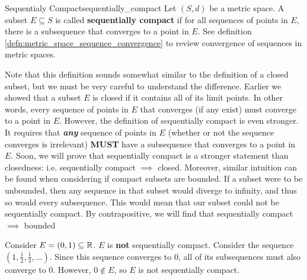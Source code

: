 

\begin{defn}{Sequentialy Compact}{sequentially_compact}
Let \((S, d)\) be a metric space. A subset \(E \subseteq S\) is called \textbf{sequentially compact} if for all sequences of points in \(E\), there is a subsequence that converges to a point in \(E\). See definition \ref{defn:metric_space_sequence_convergence} to review convergence of sequences in metric spaces.
\newline 

Note that this definition sounds somewhat similar to the definition of a closed subset, but we must be very careful to understand the difference. Earlier we showed that a subset \(E\)
 is closed if it contains all of its limit points. In other words, every sequence of points in \(E\) that converges (if any exist) must converge to a point in \(E\). However, the definition of sequentially compact is even stronger. It requires that \textbf{\textit{any}} sequence of points in \(E\) (whether or not the sequence converges is irrelevant) \textbf{MUST} have a subsequence that converges to a point in \(E\). Soon, we will prove that sequentially compact is a stronger statement than closedness: i.e. sequentially compact \(\implies\) closed. Moreover, similar intuition can be found when considering if compact subsets are bounded. If a subset were to be unbounded, then any sequence in that subset would diverge to infinity, and thus so would every subsequence. This would mean that our subset could not be sequentially compact. By contrapositive, we will find that sequentially compact\(\implies\) bounded
 \end{defn}
\begin{exmp}{}{}
Consider \(E = (0, 1) \subseteq {\mathbb R}\). \(E\) is \textbf{not} sequentially compact. Consider the sequence \((1, \frac{1}{2}, \frac{1}{3}, \dots)\). Since this sequence converges to 0, all of its subsequences must also converge to 0. However, \(0 \not \in E\), so \(E\) is not sequentially compact.
\end{exmp}
